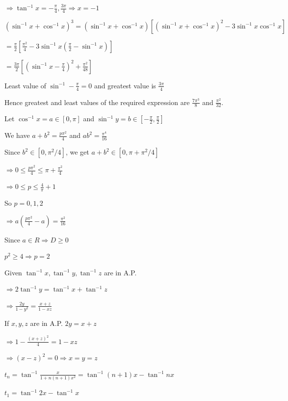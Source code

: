   $\Rightarrow \tan^{-1}x = -\frac{\pi}{4}, \frac{3\pi}{4} \Rightarrow x = -1$

\item $(\sin^{-1}x + \cos^{-1}x)^3 = (\sin^{-1}x + \cos^{-1}x)[(\sin^{-1}x + \cos^{-1}x)^2 - 3\sin^{-1}x\cos^{-1}x]$

  $= \frac{\pi}{2}\left[\frac{\pi^2}{4} - 3\sin^{-1}x\left(\frac{\pi}{2} - \sin^{-1}x\right)\right]$

  $= \frac{3\pi}{2}\left[\left(\sin^{-1}x - \frac{\pi}{4}\right)^2 + \frac{\pi^2}{48}\right]$

  Least value of $\sin^{-1} - \frac{\pi}{4} = 0$ and greatest value is $\frac{3\pi}{4}$

  Hence greatest and least values of the required expression are $\frac{7\pi^3}{8}$ and $\frac{\pi^2}{32}$.

\item Let $\cos^{-1}x = a \in [0, \pi]$ and $\sin^{-1}y = b \in\left[-\frac{\pi}{2}, \frac{\pi}{2}\right]$

  We have $a + b^2 = \frac{p\pi^2}{4}$ and $ab^2 = \frac{\pi^4}{16}$

  Since $b^2\in [0, \pi^2/4]$, we get $a + b^2 \in [0, \pi + \pi^2/4]$

  $\Rightarrow 0 \leq \frac{p\pi^2}{4}\leq \pi + \frac{\pi^2}{4}$

  $\Rightarrow 0\leq p\leq \frac{4}{\pi} + 1$

  So $p = 0, 1, 2$

  $\Rightarrow a\left(\frac{p\pi^2}{4} - a\right) = \frac{\pi^2}{16}$

  Since $a\in R \Rightarrow D\geq 0$

  $p^2 \geq 4\Rightarrow p = 2$

\item Given $\tan^{-1}x, \tan^{-1}y, \tan^{-1}z$ are in A.P.

  $\Rightarrow 2\tan^{-1}y = \tan^{-1}x + \tan^{-1}z$

  $\Rightarrow \frac{2y}{1 - y^2} = \frac{x + z}{1 - xz}$

  If $x, y, z$ are in A.P. $2y = x + z$

  $\Rightarrow 1 - \frac{(x + z)^2}{4} = 1 - xz$

  $\Rightarrow (x - z)^2 = 0 \Rightarrow x = y = z$

\item $t_n = \tan^{-1}\frac{x}{1 + n(n + 1)x^2} = \tan^{-1}(n + 1)x - \tan^{-1}nx$

  $t_1 = \tan^{-1}2x - \tan^{-1}x$


